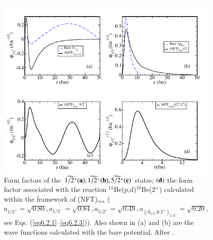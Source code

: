       \begin{figure}
      \centerline{\includegraphics*[width=16cm,angle=0]{C8/figsC8/fig6_2_4}}
      	\caption{ Form factors  of the $\widetilde {1/2^+} {\bf (a)}, \widetilde{1/2^-} {\bf (b)}, \widetilde{5/2^+} {\bf (c)}$ 
      	states; ${\bf (d)}$ the form factor associated with the reaction
      	$^{11}$Be(p,d)$^{10}$Be(2$^+$)
      	calculated within the framework of (NFT)$_{ren }$ 
      	($a_{1/2^+} = \sqrt{0.80},
      	a_{1/2^-} = \sqrt{0.84}, a_{5/2^+} = \sqrt{0.49}, a_{(d_{5/2}\otimes 2^+)_{1/2^+}} = \sqrt{0.20}$, see Eqs. (\ref{eq6.2.1}--\ref{eq6.2.3})).
      	Also shown in (a) and (b) are 
      	the wave functions calculated with the bare potential. After \cite{Barranco:17}.
      	}\label{fig6.2.4}
      \end{figure} 
